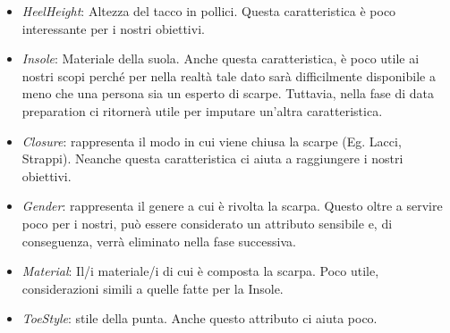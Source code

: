 \documentclass[a4paper, 11pt, oneside]{report}
\begin{document}
\begin{itemize}
\begin{center}
                    \end{center}
                    \item \textit{HeelHeight}: Altezza del tacco in pollici.
                    Questa caratteristica è poco interessante per i nostri obiettivi.
                    \item \textit{Insole}: Materiale della suola.
                    Anche questa caratteristica, è poco utile ai nostri scopi perché per nella realtà tale dato sarà
                    difficilmente disponibile a meno che una persona sia un esperto di scarpe.
                    Tuttavia, nella fase di data preparation ci ritornerà utile per imputare un'altra caratteristica.
                    \item \textit{Closure}: rappresenta il modo in cui viene chiusa la scarpe (Eg. Lacci, Strappi).
                    Neanche questa caratteristica ci aiuta a raggiungere i nostri obiettivi.
                    \item \textit{Gender}: rappresenta il genere a cui è rivolta la scarpa.
                    Questo oltre a servire poco per i nostri, può essere considerato un attributo sensibile e,
                    di conseguenza, verrà eliminato nella fase successiva.
                    \item \textit{Material}: Il/i materiale/i di cui è composta la scarpa.
                    Poco utile, considerazioni simili a quelle fatte per la Insole.
                    \item \textit{ToeStyle}: stile della punta.
                    Anche questo attributo ci aiuta poco.
                \end{itemize}
                \newpage
\end{document}
